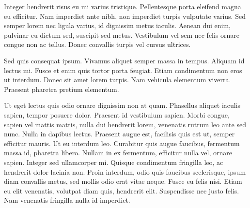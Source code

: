 Integer hendrerit risus eu mi varius tristique. Pellentesque porta eleifend magna eu efficitur. Nam imperdiet ante nibh, non imperdiet turpis vulputate varius. Sed semper lorem nec ligula varius, id dignissim metus iaculis. Aenean dui enim, pulvinar eu dictum sed, suscipit sed metus. Vestibulum vel sem nec felis ornare congue non ac tellus. Donec convallis turpis vel cursus ultrices.

Sed quis consequat ipsum. Vivamus aliquet semper massa in tempus. Aliquam id lectus mi. Fusce et enim quis tortor porta feugiat. Etiam condimentum non eros ut interdum. Donec sit amet lorem turpis. Nam vehicula elementum viverra. Praesent pharetra pretium elementum.

Ut eget lectus quis odio ornare dignissim non at quam. Phasellus aliquet iaculis sapien, tempor posuere dolor. Praesent id vestibulum sapien. Morbi congue, sapien vel mattis mattis, nulla dui hendrerit lorem, venenatis rutrum leo ante sed nunc. Nulla in dapibus lectus. Praesent augue est, facilisis quis est ut, semper efficitur mauris. Ut eu interdum leo. Curabitur quis augue faucibus, fermentum massa id, pharetra libero. Nullam in ex fermentum, efficitur nulla vel, ornare sapien. Integer sed ullamcorper mi. Quisque condimentum fringilla leo, ac hendrerit dolor lacinia non. Proin interdum, odio quis faucibus scelerisque, ipsum diam convallis metus, sed mollis odio erat vitae neque. Fusce eu felis nisi. Etiam eu elit venenatis, volutpat diam quis, hendrerit elit. Suspendisse nec justo felis. Nam venenatis fringilla nulla id imperdiet.